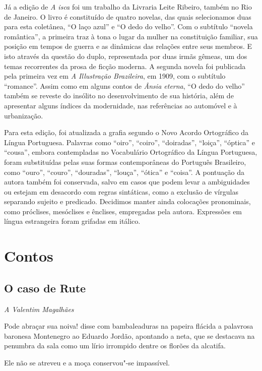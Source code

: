 Já a edição de \emph{A isca} foi um trabalho da Livraria Leite Ribeiro,
também no Rio de Janeiro. O livro é constituído de quatro novelas, das
quais selecionamos duas para esta coletânea, ``O laço azul'' e ``O dedo
do velho''. Com o subtítulo ``novela romântica'', a primeira traz à tona
o lugar da mulher na constituição familiar, sua posição em tempos de
guerra e as dinâmicas das relações entre seus membros. E isto através da
questão do duplo, representada por duas irmãs gêmeas, um dos temas
recorrentes da prosa de ficção moderna. A segunda novela foi publicada
pela primeira vez em \emph{A Illustração Brazileira}, em 1909, com o
subtítulo ``romance''. Assim como em alguns contos de \emph{Ânsia
eterna}, ``O dedo do velho'' também se reveste do insólito no
desenvolvimento de sua história, além de apresentar alguns índices da
modernidade, nas referências ao automóvel e à urbanização.

Para esta edição, foi atualizada a grafia segundo o Novo Acordo
Ortográfico da Língua Portuguesa. Palavras como ``oiro'', ``coiro'',
``doiradas'', ``loiça'', ``óptica'' e ``cousa'', embora contempladas no
Vocabulário Ortográfico da Língua Portuguesa, foram substituídas pelas
suas formas contemporâneas do Português Brasileiro, como ``ouro'',
``couro'', ``douradas'', ``louça'', ``ótica'' e ``coisa''. A pontuação
da autora também foi conservada, salvo em casos que podem levar a
ambiguidades ou estejam em desacordo com regras sintáticas, como a
exclusão de vírgulas separando sujeito e predicado. Decidimos manter
ainda colocações pronominais, como próclises, mesóclises e ênclises,
empregadas pela autora. Expressões em língua estrangeira foram grifadas
em itálico.

\part{Contos}

\chapter{O caso de Rute}

\hfill\emph{A Valentim Magalhães}

\bigskip

Pode abraçar sua noiva! disse com bambaleaduras na papeira flácida a
palavrosa baronesa Montenegro ao Eduardo Jordão, apontando a neta, que
se destacava na penumbra da sala como um lírio irrompido dentre os
florões da alcatifa.

Ele não se atreveu e a moça conservou"-se impassível.

